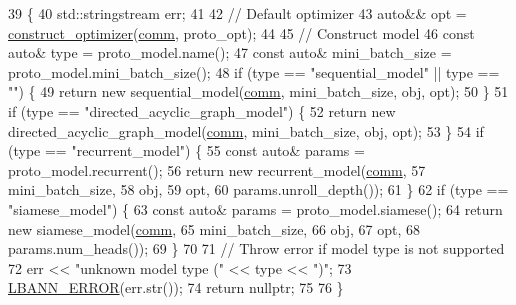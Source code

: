 \begin{DoxyCode}
39                                                              \{
40   std::stringstream err;
41 
42   \textcolor{comment}{// Default optimizer}
43   \textcolor{keyword}{auto}&& opt = \hyperlink{namespacelbann_1_1proto_af85d2b9f1e986bbab4feccfaa19c9960}{construct\_optimizer}(\hyperlink{file__io_8cpp_ab048c6f9fcbcfaa57ce68b00263dbebe}{comm}, proto\_opt);
44 
45   \textcolor{comment}{// Construct model}
46   \textcolor{keyword}{const} \textcolor{keyword}{auto}& type = proto\_model.name();
47   \textcolor{keyword}{const} \textcolor{keyword}{auto}& mini\_batch\_size = proto\_model.mini\_batch\_size();
48   \textcolor{keywordflow}{if} (type == \textcolor{stringliteral}{"sequential\_model"} || type == \textcolor{stringliteral}{""}) \{
49     \textcolor{keywordflow}{return} \textcolor{keyword}{new} sequential\_model(\hyperlink{file__io_8cpp_ab048c6f9fcbcfaa57ce68b00263dbebe}{comm}, mini\_batch\_size, obj, opt);
50   \}
51   \textcolor{keywordflow}{if} (type == \textcolor{stringliteral}{"directed\_acyclic\_graph\_model"}) \{
52     \textcolor{keywordflow}{return} \textcolor{keyword}{new} directed\_acyclic\_graph\_model(\hyperlink{file__io_8cpp_ab048c6f9fcbcfaa57ce68b00263dbebe}{comm}, mini\_batch\_size, obj, opt);
53   \}
54   \textcolor{keywordflow}{if} (type == \textcolor{stringliteral}{"recurrent\_model"}) \{
55     \textcolor{keyword}{const} \textcolor{keyword}{auto}& params = proto\_model.recurrent();
56     \textcolor{keywordflow}{return} \textcolor{keyword}{new} recurrent\_model(\hyperlink{file__io_8cpp_ab048c6f9fcbcfaa57ce68b00263dbebe}{comm},
57                                mini\_batch\_size,
58                                obj,
59                                opt,
60                                params.unroll\_depth());
61   \}
62   \textcolor{keywordflow}{if} (type == \textcolor{stringliteral}{"siamese\_model"}) \{
63     \textcolor{keyword}{const} \textcolor{keyword}{auto}& params = proto\_model.siamese();
64     \textcolor{keywordflow}{return} \textcolor{keyword}{new} siamese\_model(\hyperlink{file__io_8cpp_ab048c6f9fcbcfaa57ce68b00263dbebe}{comm},
65                              mini\_batch\_size,
66                              obj,
67                              opt,
68                              params.num\_heads());
69   \}
70 
71   \textcolor{comment}{// Throw error if model type is not supported}
72   err << \textcolor{stringliteral}{"unknown model type ("} << type << \textcolor{stringliteral}{")"};
73   \hyperlink{base_8hpp_a80b1d707117e968a6951b7222e4b2b87}{LBANN\_ERROR}(err.str());
74   \textcolor{keywordflow}{return} \textcolor{keyword}{nullptr};
75 
76 \}
\end{DoxyCode}
